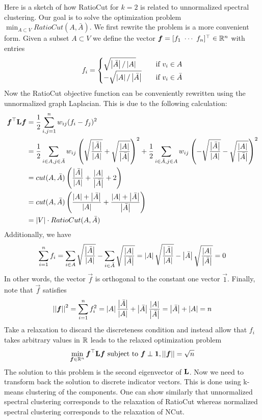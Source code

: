 Here is a sketch of how RatioCut for $k=2$ is related to unnormalized spectral clustering. Our goal is to solve the optimization problem $\min_{A\subset V}RatioCut(A,\bar{A})$. We first rewrite the problem is a more convenient form. Given a subset $A\subset V$ we define the vector $\vec{f}=[f_1\ \cdots\ f_n]\T\in\bR^n$ with entries
\begin{align*}
	f_i=\begin{cases}\sqrt{\left\vert\bar{A}\right\vert/\left\vert A\right\vert}&\quad\text{if }v_i\in A \\ -\sqrt{\left\vert A\right\vert/\left\vert\bar{A}\right\vert}&\quad\text{if }v_i\in\bar{A}\end{cases}
\end{align*}
Now the RatioCut objective function can be conveniently rewritten using the unnormalized graph Laplacian. This is due to the following calculation:
\begin{align*}
	\boldsymbol{f}^\top\mathbf{L}\boldsymbol{f}&=\frac{1}{2}\sum_{i,j=1}^nw_{ij}(f_i-f_j)^2 \\
	&=\frac{1}{2}\sum_{i\in A,j\in\bar{A}}w_{ij}\left(\sqrt{\frac{\left\vert\bar{A}\right\vert}{\left\vert A\right\vert}}+\sqrt{\frac{\left\vert A\right\vert}{\left\vert\bar{A}\right\vert}}\right)^2+\frac{1}{2}\sum_{i\in\bar{A},j\in A}w_{ij}\left(-\sqrt{\frac{\left\vert\bar{A}\right\vert}{\left\vert A\right\vert}}-\sqrt{\frac{\left\vert A\right\vert}{\left\vert\bar{A}\right\vert}}\right)^2 \\
	&=cut(A,\bar{A})\left(\frac{\left\vert\bar{A}\right\vert}{\left\vert A\right\vert}+\frac{\left\vert A\right\vert}{\left\vert\bar{A}\right\vert}+2\right) \\
	&=cut(A,\bar{A})\left(\frac{\left\vert A\right\vert+\left\vert\bar{A}\right\vert}{\left\vert A\right\vert}+\frac{\left\vert A\right\vert+\left\vert\bar{A}\right\vert}{\left\vert\bar{A}\right\vert}\right) \\
	&=\left\vert V\right\vert\cdot RatioCut(A,\bar{A})
\end{align*}
Additionally, we have
\begin{align*}
	\sum_{i=1}^nf_i=\sum_{i\in A}\sqrt{\frac{\left\vert\bar{A}\right\vert}{\left\vert A\right\vert}}-\sum_{i\in\bar{A}}\sqrt{\frac{\left\vert A\right\vert}{\left\vert\bar{A}\right\vert}}=\left\vert A\right\vert\sqrt{\frac{\left\vert\bar{A}\right\vert}{\left\vert A\right\vert}}-\left\vert\bar{A}\right\vert\sqrt{\frac{\left\vert A\right\vert}{\left\vert\bar{A}\right\vert}}=0
\end{align*}
In other words, the vector $\vec{f}$ is orthogonal to the constant one vector $\vec{1}$. Finally, note that $\vec{f}$ satisfies
\begin{align*}
	\left\vert\left\vert \boldsymbol{f} \right\vert\right\vert^2=\sum_{i=1}^nf_i^2=\left\vert A\right\vert\frac{\left\vert\bar{A}\right\vert}{\left\vert A\right\vert}+\left\vert\bar{A}\right\vert\frac{\left\vert A\right\vert}{\left\vert\bar{A}\right\vert}=\left\vert\bar{A}\right\vert+\left\vert A\right\vert=n
\end{align*}
Take a relaxation to discard the discreteness condition and instead allow that $f_i$ takes arbitrary values in $\mathbb{R}$ leads to the relaxed optimization problem
\begin{align*}
	\min_{\boldsymbol{f}\in\mathbb{R}^n}\boldsymbol{f}^\top\mathbf{L}\boldsymbol{f}\ \text{subject to }\boldsymbol{f}\perp\boldsymbol{1},\left\vert\left\vert \boldsymbol{f} \right\vert\right\vert=\sqrt{n}
\end{align*}
The solution to this problem is the second eigenvector of $\mathbf{L}$. Now we need to transform back the solution to discrete indicator vectors. This is done using k-means clustering of the components. One can show similarly that unnormalized spectral clustering corresponds to the relaxation of RatioCut whereas normalized spectral clustering corresponds to the relaxation of NCut.

